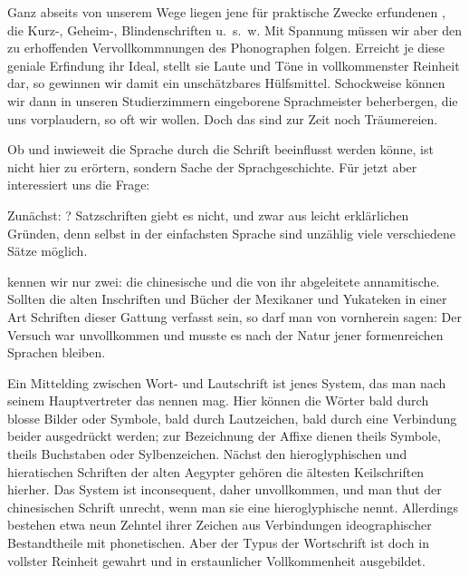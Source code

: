 Ganz abseits von unserem Wege liegen jene für praktische Zwecke erfundenen , die Kurz-, Geheim-, Blindenschriften u.~s.~w. Mit Spannung müssen wir aber den zu erhoffenden Vervollkommnungen des Phonographen folgen. Erreicht je diese geniale Erfindung ihr Ideal, stellt sie Laute und Töne in vollkommenster Reinheit dar, so gewinnen wir damit ein unschätzbares Hülfsmittel. Schockweise können wir dann \label{fp.139} in unseren Studierzimmern eingeborene Sprachmeister beherbergen, die uns vorplaudern, so oft wir wollen. Doch das sind zur Zeit noch Träumereien.

Ob und inwieweit die Sprache durch die Schrift beeinflusst werden könne, ist nicht hier zu erörtern, sondern Sache der Sprachgeschichte. Für jetzt aber interessiert uns die Frage: 

Zunächst: ? Satzschriften giebt es nicht, und zwar aus leicht erklärlichen Gründen, denn selbst in der einfachsten Sprache sind unzählig viele verschiedene Sätze möglich.

 kennen wir nur zwei: die chinesische und die von ihr abgeleitete annamitische. Sollten die alten Inschriften und Bücher der Mexikaner und Yukateken in einer Art Schriften dieser Gattung verfasst sein, so darf man von vornherein sagen: Der Versuch war unvollkommen und musste es nach der Natur jener formenreichen Sprachen bleiben.

Ein Mittelding zwischen Wort- und Lautschrift ist jenes System, das man nach seinem Hauptvertreter das  nennen mag. Hier können die Wörter bald durch blosse Bilder oder Symbole, bald durch Lautzeichen, bald durch eine Verbindung beider ausgedrückt werden; zur Bezeichnung der Affixe dienen theils Symbole, theils Buchstaben oder Sylbenzeichen. Nächst den hieroglyphischen und hieratischen Schriften der alten Aegypter gehören die ältesten Keilschriften hierher. Das System ist inconsequent, daher unvollkommen, und man thut der chinesischen Schrift unrecht, wenn man sie eine hieroglyphische nennt. Allerdings bestehen etwa neun Zehntel ihrer Zeichen aus Verbindungen ideographischer Bestandtheile mit phonetischen. Aber der Typus der \label{sp.131} Wortschrift ist doch in vollster Reinheit gewahrt und in erstaunlicher Vollkommenheit ausgebildet. 

